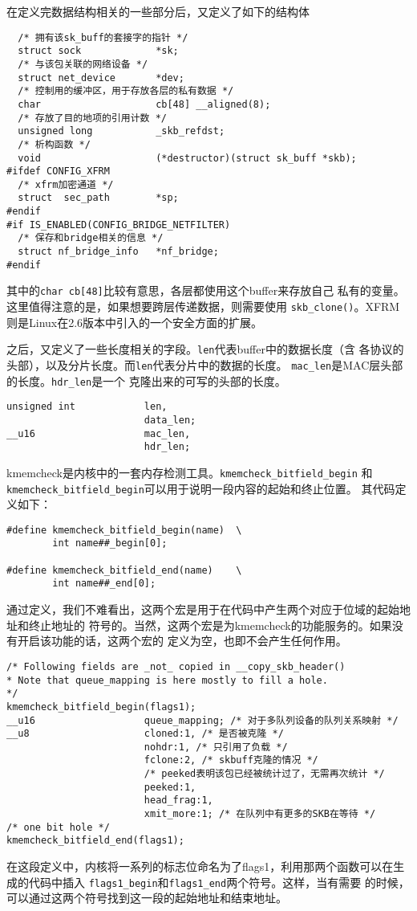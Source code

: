 \documentclass[11pt, a4paper,oneside]{book}
\theoremstyle{ocrenumbox}
\theoremstyle{purplenumbox}
\theoremstyle{blackbox}
\begin{document}
在定义完数据结构相关的一些部分后，又定义了如下的结构体
\begin{verbatim}
  /* 拥有该sk_buff的套接字的指针 */
  struct sock             *sk;
  /* 与该包关联的网络设备 */
  struct net_device       *dev;
  /* 控制用的缓冲区，用于存放各层的私有数据 */
  char                    cb[48] __aligned(8);
  /* 存放了目的地项的引用计数 */
  unsigned long           _skb_refdst;
  /* 析构函数 */
  void                    (*destructor)(struct sk_buff *skb);
#ifdef CONFIG_XFRM
  /* xfrm加密通道 */
  struct  sec_path        *sp;
#endif
#if IS_ENABLED(CONFIG_BRIDGE_NETFILTER)
  /* 保存和bridge相关的信息 */
  struct nf_bridge_info   *nf_bridge;
#endif
\end{verbatim}
其中的\texttt{char cb[48]}比较有意思，各层都使用这个buffer来存放自己
私有的变量。这里值得注意的是，如果想要跨层传递数据，则需要使用
\texttt{skb_clone()}。XFRM则是Linux在2.6版本中引入的一个安全方面的扩展。

之后，又定义了一些长度相关的字段。\texttt{len}代表buffer中的数据长度（含
各协议的头部），以及分片长度。而\texttt{len}代表分片中的数据的长度。
\texttt{mac_len}是MAC层头部的长度。\texttt{hdr_len}是一个
克隆出来的可写的头部的长度。
\begin{verbatim}
unsigned int            len,
                        data_len;
__u16                   mac_len,
                        hdr_len;
\end{verbatim}

kmemcheck是内核中的一套内存检测工具。\texttt{kmemcheck_bitfield_begin}
和\texttt{kmemcheck_bitfield_begin}可以用于说明一段内容的起始和终止位置。
其代码定义如下：
\begin{verbatim}
#define kmemcheck_bitfield_begin(name)  \
        int name##_begin[0];

#define kmemcheck_bitfield_end(name)    \
        int name##_end[0];
\end{verbatim}

通过定义，我们不难看出，这两个宏是用于在代码中产生两个对应于位域的起始地址和终止地址的
符号的。当然，这两个宏是为kmemcheck的功能服务的。如果没有开启该功能的话，这两个宏的
定义为空，也即不会产生任何作用。
\begin{verbatim}
/* Following fields are _not_ copied in __copy_skb_header()
* Note that queue_mapping is here mostly to fill a hole.
*/
kmemcheck_bitfield_begin(flags1);
__u16                   queue_mapping; /* 对于多队列设备的队列关系映射 */
__u8                    cloned:1, /* 是否被克隆 */
                        nohdr:1, /* 只引用了负载 */
                        fclone:2, /* skbuff克隆的情况 */
                        /* peeked表明该包已经被统计过了，无需再次统计 */
                        peeked:1,
                        head_frag:1,
                        xmit_more:1; /* 在队列中有更多的SKB在等待 */
/* one bit hole */
kmemcheck_bitfield_end(flags1);
\end{verbatim}
在这段定义中，内核将一系列的标志位命名为了flags1，利用那两个函数可以在生成的代码中插入
\texttt{flags1_begin}和\texttt{flags1_end}两个符号。这样，当有需要
的时候，可以通过这两个符号找到这一段的起始地址和结束地址。
\end{document}
